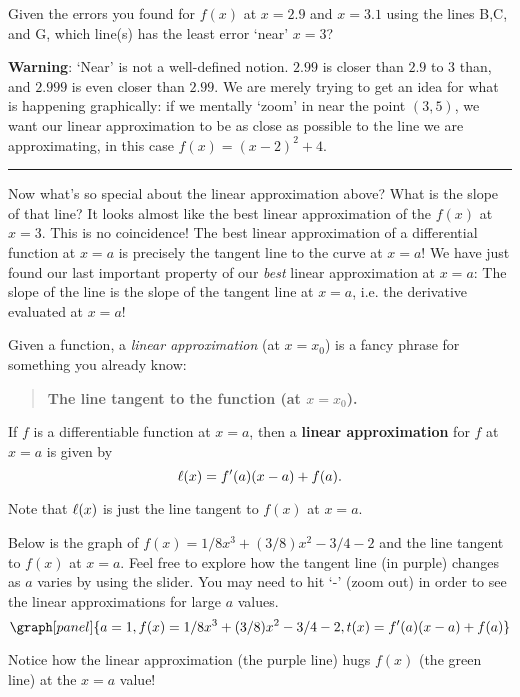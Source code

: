 \documentclass[handout,nooutcomes]{ximera}
\begin{document}
\begin{question}
Given the errors you found for $f(x)$ at $x=2.9$ and $x=3.1$ using the lines B,C, and G, which line(s) has the least error `near' $x=3$?
\begin{selectAll}
\end{selectAll}
\end{question}

{\bf Warning}: `Near' is not a well-defined notion. $2.99$ is closer than $2.9$
to $3$ than, and
$2.999$ is even closer than $2.99$. We are merely trying to get 
an idea for what is happening graphically: if we mentally `zoom' in 
near the point $(3,5)$, we want our linear approximation to
be as close as possible to the line we are approximating, in this case $f(x) = (x-2)^2 + 4$.\\
\hrule
\medskip

Now what's so special about the linear approximation above? 
What is the slope of that line? It looks almost like the best linear
approximation of the $f(x)$ at $x=3$. This is no coincidence! 
The best linear approximation of a differential function at $x=a$
is precisely the tangent line to the curve at $x=a$! We have just found our last important property of our {\it best} linear approximation at $x=a$: The slope of the line is the slope of the tangent line at $x=a$, i.e. the derivative evaluated at $x=a$!


Given a function, a \textit{linear approximation} (at $x=x_0$) is a fancy phrase
for something you already know:
\begin{center}
\begin{quote}
  \textbf{The line tangent to the function (at $x=x_0$).}
\end{quote}
\end{center}


\begin{definition}
If $f$ is a differentiable function at $x=a$, then a \textbf{linear
  approximation} for $f$ at $x=a$ is given by
\[
\ell(x) = f'(a)(x-a) +f(a).\\
\]
\end{definition}






Note that $\ell(x)$ is just the line tangent to $f(x)$ at $x=a$.


\begin{example}
Below is the graph of $f(x) = 1/8x^3 + (3/8)x^2 -3/4 - 2$ and the line
tangent to $f(x)$ at $x=a$. Feel free to explore how the tangent line
(in purple) changes as $a$ varies by using the slider. You may need to
hit `-' (zoom out) in order to see the linear approximations for large $a$ values.
\[
\graph[panel]{a=1, f(x) = 1/8x^3 + (3/8)x^2 -3/4 - 2, t(x) = f'(a)(x-a)+ f(a)}
\]

Notice how the linear approximation (the purple line) hugs
$f(x)$ (the green line) at the $x=a$ value!
\end{example}
\end{document}
